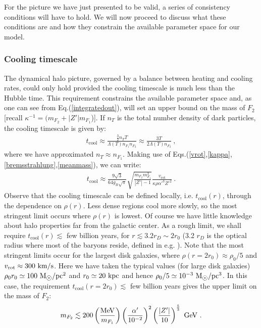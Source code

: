 \documentclass[12pt]{article}
\begin{document}
{{For the picture we have just presented to be valid, a series of
consistency conditions will have to hold. We will now proceed to discuss
what these conditions are and how they constrain the available parameter
space for our model.

\subsubsection{Cooling timescale}

The dynamical halo picture, governed by a balance between heating and
cooling rates, could only hold provided the cooling timescale is much
less than the Hubble time. This requirement constrains the available
parameter space and, as one can see from Eq.(\ref{integratedout}), will
set an upper bound on the mass of $F_2$ [recall $\kappa ^{-1} = (m
_{F_2} + |Z'|m _{F_1}$)]. If $n _T$ is the total number density of dark
particles, the cooling timescale is given by:
%
\begin{eqnarray}
t _{\text{cool}} \approx \frac{\frac{3}{2}n _TT}{\Lambda (T)n _{F_1}n
_{F_2}} \approx \frac{3T}{2\Lambda (T)n _{F_2}} \ ,
\label{cooling}
\end{eqnarray}
%
where we have approximated $n _T \approx n _{F_1}$. Making use of
Eqs.(\ref{vrot},\ref{kappa},\ref{bremsstrahlung},\ref{meanmass}), we can
write:
%
\begin{eqnarray}
t _{\text{cool}} \approx \frac{9\sqrt{3}}{64\overline{g}
_B\sqrt{\pi}}\sqrt{\frac{m _{F_2}m _{F_1} ^3}{|Z'|-1}}\frac{v
_{\text{rot}}}{\kappa \rho {\alpha '} ^3{Z'} ^2} \ .
\end{eqnarray}
%
Observe that the cooling timescale can be defined locally, i.e. $t
_{\text{cool}}(r)$, through the dependence on $\rho (r)$. Less dense
regions cool more slowly, so the most stringent limit occurs where $\rho
(r)$ is lowest. Of course we have little knowledge about halo properties
far from the galactic center. As a rough limit, we shall require  $t
_{\text{cool}}(r) \lesssim$ few billion years, for $r \lesssim 3.2 r _D
\sim 2 r _0$ (3.2 $r _D$ is the optical 
radius where most of the baryons reside, defined in e.g.
\cite{optical}). Note that the most stringent limits occur for the
largest disk galaxies, where $\rho (r=2r _0) \approx \rho _0/5$ and $v
_{\text{rot}} \approx 300 \ \rm km/s$. Here we have taken the typical
values (for large disk galaxies) $\rho _0r _0 \simeq 100 \ \rm M
_{\astrosun}/pc ^2$ and $r _0 \simeq 20 \ \rm kpc$ and hence $\rho _0/5
\simeq 10 ^{-3} \ {\rm M _{\astrosun}/pc ^3}$. In this case, the
requirement $t _{\text{cool}} (r=2r _0) \lesssim$ few billion years
gives the upper limit on the mass of $F_2$:
%
\begin{eqnarray}
m _{F_2} \lesssim 200 \left ( \frac{\rm MeV}{m _{F_1}} \right )\left (
\frac{\alpha '}{10 ^{-2}} \right ) ^2\left ( \frac{|Z'|}{10} \right )
^{\frac{5}{3}} \ \rm GeV \ .
\label{mf2cool}
\end{eqnarray}
%

}}
\end{document}
